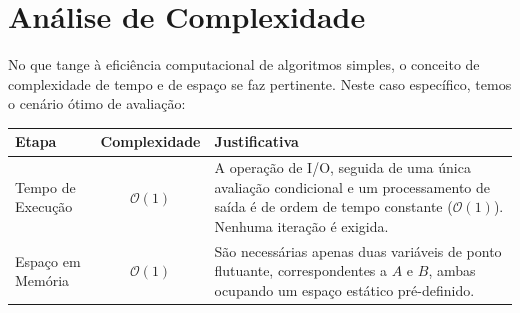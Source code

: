 \documentclass[12pt]{article}
\begin{document}
\begin{center}
\end{center}

\newpage
\section*{Análise de Complexidade}

No que tange à eficiência computacional de algoritmos simples, o conceito de complexidade de tempo e de espaço se faz pertinente. Neste caso específico, temos o cenário ótimo de avaliação:

\begin{center}
\begin{tabularx}{\textwidth}{|l|c|X|}
\hline
\textbf{Etapa} & \textbf{Complexidade} & \textbf{Justificativa} \\
\hline
Tempo de Execução & $\mathcal{O}(1)$ & A operação de I/O, seguida de uma única avaliação condicional e um processamento de saída é de ordem de tempo constante ($\mathcal{O}(1)$). Nenhuma iteração é exigida. \\
\hline
Espaço em Memória & $\mathcal{O}(1)$ & São necessárias apenas duas variáveis de ponto flutuante, correspondentes a $A$ e $B$, ambas ocupando um espaço estático pré-definido. \\
\hline
\end{tabularx}
\end{center}
\end{document}
